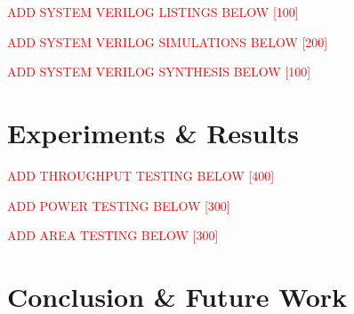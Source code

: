 \documentclass[12pt,twoside,a4paper]{report}
\begin{document}
	\textcolor{red}{ADD SYSTEM VERILOG LISTINGS BELOW [100]}
    
	\textcolor{red}{ADD SYSTEM VERILOG SIMULATIONS BELOW [200]}
    
	\textcolor{red}{ADD SYSTEM VERILOG SYNTHESIS BELOW [100]}
    
	\chapter{Experiments \& Results}
	\label{chapter:RESULT}
    
	\textcolor{red}{ADD THROUGHPUT TESTING BELOW [400]}
    
	\textcolor{red}{ADD POWER TESTING BELOW [300]}
    
	\textcolor{red}{ADD AREA TESTING BELOW [300]}
    
	\chapter{Conclusion \& Future Work}
	\label{chapter:CONC}
    
	
	
    
	\appendix    
    
\end{document}
